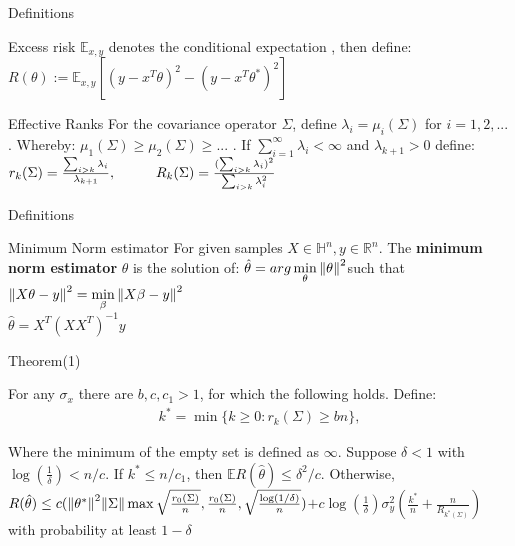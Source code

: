 \documentclass{beamer}
\begin{document}
\begin{frame}{Definitions}
\begin{center}
\begin{block}{Excess risk}
	$\mathbb{E}_{x,y}$ denotes the conditional expectation , then define:
	$R(\theta):= \mathbb{E}_{x,y}[(y - x^T\theta)^2 - (y - x^T\theta^*)^2]$
\end{block}
\begin{block}{Effective Ranks}
	For the covariance operator $\Sigma$, define $\lambda_i = \mu_i(\Sigma)$ for $i = 1,2,...$ . Whereby: $\mu_1(\Sigma) \geq \mu_2(\Sigma) \geq ...$ . If $\sum\limits_{i=1}^\infty \lambda_i < \infty$ and $\lambda_{k+1} > 0$
	define: 
	$r_k(\Sigma) = \frac{\sum_{i>k}\lambda_i}{\lambda_{k+1}} ,\hspace*{1cm}
	R_k(\Sigma) = \frac{(\sum_{i>k}\lambda_i)^2}{\sum_{i>k}\lambda_i^2}$
\end{block}
\end{center}
\end{frame}

\begin{frame}{Definitions}
	\begin{center}
		\begin{block}{Minimum Norm estimator}
			For given samples \(X \in \mathbb{H}^n, y \in \mathbb{R}^n\). The \textbf{minimum norm estimator} \(\theta\) is the solution of:
			\hspace*{0.4 cm}$\hat{\theta} = arg \min\limits_{\theta} \norm{\theta}^2$\newline such that  $\norm{X \theta - y}^2 = \min\limits_\beta \norm{X \beta - y}^2$\\
			\hspace*{3 cm} $\hat{\theta} = X^T(XX^T)^{-1}y$
		\end{block}
	\end{center}
\end{frame}


\begin{frame}{Theorem(1)}
	
For any $\sigma_x$ there are $b,c,c_1 > 1$, for which the following holds.
Define:
\begin{align*}
k^* = \min \{k \geq 0: r_k(\Sigma) \geq bn\},
\end{align*}
	
Where the minimum of the empty set is defined as $\infty$. Suppose $\delta < 1$ with $\log(\frac{1}{\delta}) < n/c$. If $k^* \leq n/c_1$, then $\mathbb{E}R(\hat{\theta}) \leq \delta^2/c.$ Otherwise,\\
	
	
$R(\hat{\theta}) \leq c(\norm{\theta^*}^2\norm{\Sigma}\max{\sqrt{\frac{r_0(\Sigma)}{n}},\frac{r_0(\Sigma)}{n},\sqrt{\frac{\log(1/\delta)}{n}}}) 
$\newline \hspace*{0.85 cm}$+ c\log(\frac{1}{\delta})\sigma_y^2\left(\frac{k^*}{n} + \frac{n}{R_{k^*(\Sigma)}}\right)$\\

with probability at least $1 - \delta$

\end{frame}
\end{document}
